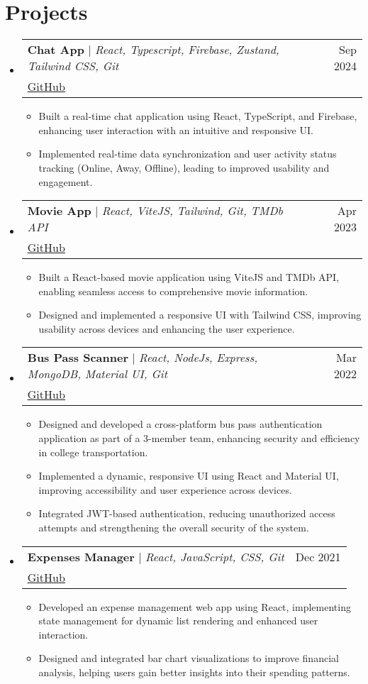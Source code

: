 \documentclass[letterpaper,11pt]{article}
\makeatletter
\newcommand{\resumeItem}[1]{
  \item\small{
    {#1 \vspace{-2pt}}
  }
}
\newcommand{\resumeProjectHeading}[3]{
    \item
    \begin{tabular*}{0.97\textwidth}{l@{\extracolsep{\fill}}r}
      \small#1 & #2 \\
      \multicolumn{2}{l}{\footnotesize#3} \\
    \end{tabular*}\vspace{-7pt}
}
\newcommand{\resumeSubHeadingListStart}{\begin{itemize}[leftmargin=0.15in, label={}]}
\newcommand{\resumeSubHeadingListEnd}{\end{itemize}}
\newcommand{\resumeItemListStart}{\begin{itemize}}
\newcommand{\resumeItemListEnd}{\end{itemize}\vspace{-5pt}}
\makeatother
\begin{document}
\section{Projects}
    \resumeSubHeadingListStart
      \resumeProjectHeading
          {\textbf{Chat App} $|$ \emph{React, Typescript, Firebase, Zustand, Tailwind CSS, Git}}{Sep 2024}
          {\href{https://github.com/aaryen-dsouza/chat-app}{\underline{GitHub}}}
          \resumeItemListStart
            \resumeItem{Built a real-time chat application using React, TypeScript, and Firebase, enhancing user interaction with an intuitive and responsive UI.}
            \resumeItem{Implemented real-time data synchronization and user activity status tracking (Online, Away, Offline), leading to improved usability and engagement.}
          \resumeItemListEnd
      \resumeProjectHeading
          {\textbf{Movie App} $|$ \emph{React, ViteJS, Tailwind, Git, TMDb API}}{Apr 2023}
          {\href{https://github.com/aaryen-dsouza/Movie-App}{\underline{GitHub}}}
          \resumeItemListStart
            \resumeItem{Built a React-based movie application using ViteJS and TMDb API, enabling seamless access to comprehensive movie information.}
            \resumeItem{Designed and implemented a responsive UI with Tailwind CSS, improving usability across devices and enhancing the user experience.}
          \resumeItemListEnd
          \resumeProjectHeading
          {\textbf{Bus Pass Scanner} $|$ \emph{React, NodeJs, Express, MongoDB, Material UI, Git}}{Mar 2022}
          {\href{https://github.com/aaryen-dsouza/BusPass_Scanner}{\underline{GitHub}}}
          \resumeItemListStart
            \resumeItem{Designed and developed a cross-platform bus pass authentication application as part of a 3-member team, enhancing security and efficiency in college transportation.}
            \resumeItem{Implemented a dynamic, responsive UI using React and Material UI, improving accessibility and user experience across devices.}
            \resumeItem{Integrated JWT-based authentication, reducing unauthorized access attempts and strengthening the overall security of the system.}
          \resumeItemListEnd
          \resumeProjectHeading
          {\textbf{Expenses Manager} $|$ \emph{React, JavaScript, CSS, Git}}{Dec 2021}
          {\href{https://github.com/aaryen-dsouza/Expenses-Manager}{\underline{GitHub}}}
          \resumeItemListStart
            \resumeItem{Developed an expense management web app using React, implementing state management for dynamic list rendering and enhanced user interaction.}
            \resumeItem{Designed and integrated bar chart visualizations to improve financial analysis, helping users gain better insights into their spending patterns.}
          \resumeItemListEnd
    \resumeSubHeadingListEnd
\end{document}
